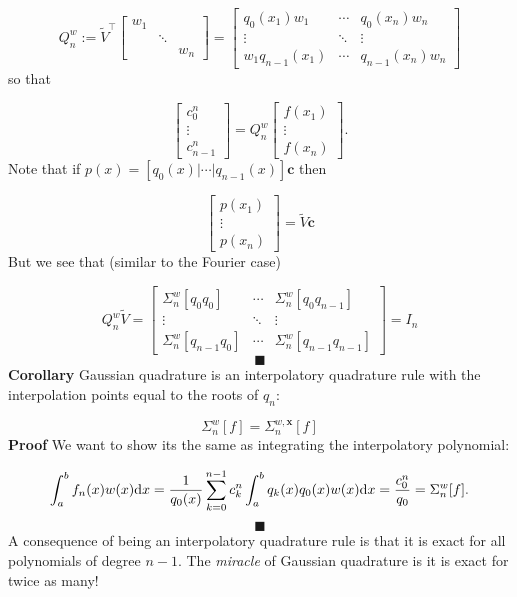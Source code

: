 \documentclass[12pt,a4paper]{article}
\begin{document}
\[
Q_n^w := \tilde{V}^{\top} \begin{bmatrix} w_1 \\ &\ensuremath{\ddots} \\&& w_n \end{bmatrix} = \begin{bmatrix} q_0(x_1)w_1 & \ensuremath{\cdots} &  q_0(x_n) w_n \\
                \ensuremath{\vdots} & \ensuremath{\ddots} & \ensuremath{\vdots} \\
                w_1q_{n-1}(x_1) & \ensuremath{\cdots} & q_{n-1}(x_n)w_n \end{bmatrix}
\]
so that

\[
\begin{bmatrix}
c_0^n \\
\ensuremath{\vdots} \\
c_{n-1}^n \end{bmatrix} = Q_n^w \begin{bmatrix} f(x_1) \\ \ensuremath{\vdots} \\ f(x_n) \end{bmatrix}.
\]
Note that if $p(x) = [q_0(x) | \ensuremath{\cdots} | q_{n-1}(x)] \mathbf{c}$ then

\[
\begin{bmatrix}
p(x_1) \\
\ensuremath{\vdots} \\
p(x_n)
\end{bmatrix} = \tilde{V} \mathbf{c}
\]
But we see that (similar to the Fourier case)

\[
Q_n^w \tilde{V} = \begin{bmatrix} \ensuremath{\Sigma}_n^w[q_0 q_0] & \ensuremath{\cdots} & \ensuremath{\Sigma}_n^w[q_0 q_{n-1}]\\
                \ensuremath{\vdots} & \ensuremath{\ddots} & \ensuremath{\vdots} \\
                \ensuremath{\Sigma}_n^w[q_{n-1} q_0] & \ensuremath{\cdots} & \ensuremath{\Sigma}_n^w[q_{n-1} q_{n-1}]
                \end{bmatrix} = I_n
\]
\[
\blacksquare
\]
\textbf{Corollary} Gaussian quadrature is an interpolatory quadrature rule with the interpolation points equal to the roots of $q_n$:

\[
\ensuremath{\Sigma}_n^w[f] = \ensuremath{\Sigma}_n^{w,\mathbf{x}}[f]
\]
\textbf{Proof} We want to show its the same as integrating the interpolatory polynomial:

\[
\int_a^b f_n(x) w(x) {\rm d}x = {1 \over q_0(x)} \sum_{k=0}^{n-1} c_k^n \int_a^b q_k(x) q_0(x) w(x) {\rm d}x
= {c_0^n \over q_0} = \ensuremath{\Sigma}_n^w[f].
\]
\[
\blacksquare
\]
A consequence of being an interpolatory quadrature rule is that it is exact for all polynomials of degree $n-1$. The \emph{miracle} of Gaussian quadrature is it is exact for twice as many!
\end{document}
